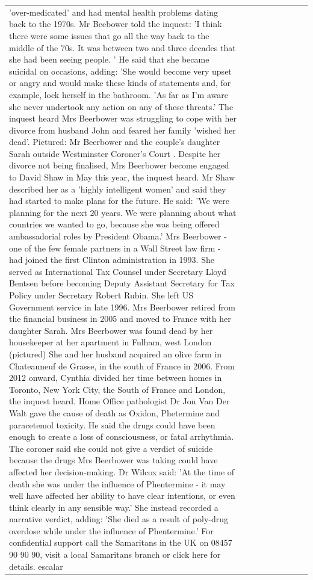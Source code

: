 \begin{table}[H]
\begin{tabular}{lllrlllll}
'over-medicated' and had mental health problems dating back to the 1970s. Mr Beebower told the inquest: 'I think there were some issues that go all the way back to the middle of the 70s. It was between two and three decades that she had been seeing people. ' He said that she became suicidal on occasions, adding: 'She would become very upset or angry and would make these kinds of statements and, for example, lock herself in the bathroom. 'As far as I'm aware she never undertook any action on any of these threats.' The inquest heard Mrs Beerbower was struggling to cope with her divorce from husband John and feared her family 'wished her dead'. Pictured: Mr Beerbower and the couple's daughter Sarah outside Westminster Coroner's Court . Despite her divorce not being finalised, Mrs Beerbower become engaged to David Shaw in May this year, the inquest heard. Mr Shaw described her as a 'highly intelligent women' and said they had started to make plans for the future. He said: 'We were planning for the next 20 years. We were planning about what countries we wanted to go, because she was being offered ambassadorial roles by President Obama.' Mrs Beerbower - one of the few female partners in a Wall Street law firm - had joined the first Clinton administration in 1993. She served as International Tax Counsel under Secretary Lloyd Bentsen before becoming Deputy Assistant Secretary for Tax Policy under Secretary Robert Rubin. She left US Government service in late 1996. Mrs Beerbower retired from the financial business in 2005 and moved to France with her daughter Sarah. Mrs Beerbower was found dead by her housekeeper at her apartment in Fulham, west London (pictured) She and her husband acquired an olive farm in Chateauneuf de Grasse, in the south of France in 2006. From 2012 onward, Cynthia divided her time between homes in Toronto, New York City, the South of France and London, the inquest heard. Home Office pathologist Dr Jon Van Der Walt gave the cause of death as Oxidon, Phetermine and paracetemol toxicity. He said the drugs could have been enough to create a loss of consciousness, or fatal arrhythmia. The coroner said she could not give a verdict of suicide because the drugs Mrs Beerbower was taking could have affected her decision-making. Dr Wilcox said: 'At the time of death she was under the influence of Phentermine - it may well have affected her ability to have clear intentions, or even think clearly in any sensible way.' She instead recorded a narrative verdict, adding: 'She died as a result of poly-drug overdose while under the influence of Phentermine.' For confidential support call the Samaritans in the UK on 08457 90 90 90, visit a local Samaritans branch or click here for details. escalar \\

\end{tabular}
\end{table}
